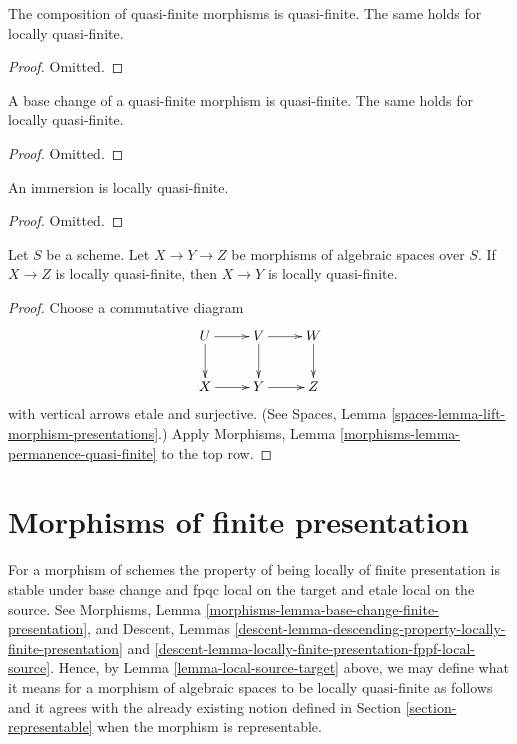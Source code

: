 \begin{lemma}
\label{lemma-composition-quasi-finite}
The composition of quasi-finite morphisms is quasi-finite.
The same holds for locally quasi-finite.
\end{lemma}

\begin{proof}
Omitted.
\end{proof}

\begin{lemma}
\label{lemma-base-change-quasi-finite}
A base change of a quasi-finite morphism is quasi-finite.
The same holds for locally quasi-finite.
\end{lemma}

\begin{proof}
Omitted.
\end{proof}

\begin{lemma}
\label{lemma-immersion-quasi-finite}
An immersion is locally quasi-finite.
\end{lemma}

\begin{proof}
Omitted.
\end{proof}

\begin{lemma}
\label{lemma-permanence-quasi-finite}
Let $S$ be a scheme.
Let $X \to Y \to Z$ be morphisms of algebraic spaces over $S$.
If $X \to Z$ is locally quasi-finite, then $X \to Y$
is locally quasi-finite.
\end{lemma}

\begin{proof}
Choose a commutative diagram
$$
\xymatrix{
U \ar[d] \ar[r] & V \ar[d] \ar[r] & W \ar[d] \\
X \ar[r] & Y \ar[r] & Z
}
$$
with vertical arrows etale and surjective. (See
Spaces, Lemma \ref{spaces-lemma-lift-morphism-presentations}.)
Apply
Morphisms, Lemma \ref{morphisms-lemma-permanence-quasi-finite}
to the top row.
\end{proof}








\section{Morphisms of finite presentation}
\label{section-finite-presentation}

\noindent
For a morphism of schemes the property of being locally of finite presentation
is stable under base change and fpqc local on the target and
etale local on the source. See
Morphisms, Lemma \ref{morphisms-lemma-base-change-finite-presentation}, and
Descent,
Lemmas \ref{descent-lemma-descending-property-locally-finite-presentation}
and
\ref{descent-lemma-locally-finite-presentation-fppf-local-source}.
Hence, by
Lemma \ref{lemma-local-source-target}
above, we may define what it means for a morphism of algebraic spaces
to be locally quasi-finite as
follows and it agrees with the already existing notion defined in
Section \ref{section-representable}
when the morphism is representable.

